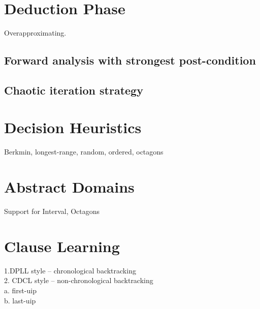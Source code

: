 \documentclass[a4paper,conference]{llncs}
\begin{document}
\section{Deduction Phase}
Overapproximating.
\subsection{Forward analysis with strongest post-condition}
\subsection{Chaotic iteration strategy} 
\section{Decision Heuristics}
Berkmin, longest-range, random, ordered, octagons 
\section{Abstract Domains}
Support for Interval, Octagons
\section{Clause Learning}
1.DPLL style -- chronological backtracking \\
2. CDCL style -- non-chronological backtracking \\
  a. first-uip \\
  b. last-uip \\



\end{document}
